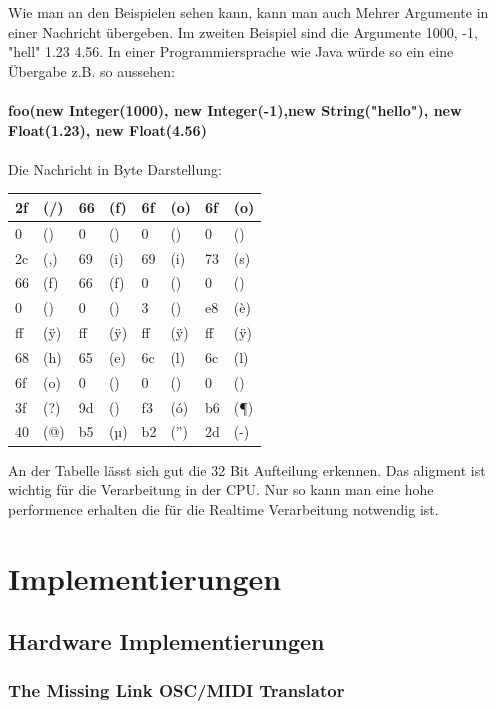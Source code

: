 \documentclass[a4paper, 12pt]{article}
\begin{document}
Wie man an den Beispielen sehen kann, kann man auch Mehrer Argumente in einer Nachricht übergeben. Im zweiten Beispiel sind die Argumente 1000, -1, "hell" 1.23 4.56.
In einer Programmiersprache wie Java würde so ein eine Übergabe z.B. so aussehen: \\
\\
{\bf foo(new Integer(1000), new Integer(-1),new String("hello"), new Float(1.23), new Float(4.56)}\\
\\
Die Nachricht in Byte Darstellung:
\begin{table}[ht]
\centering
\begin{tabular}{|p{0.5cm}|p{1.5cm}|p{0.5cm}|p{1.5cm}|p{0.5cm}|p{1.5cm}|p{0.5cm}|p{1.5cm}|}
\hline
 2f & (/) & 66 & (f) & 6f & (o) & 6f & (o)\\ \hline
 0 & () & 0 & () & 0 & () & 0 & ()\\ \hline
 2c & (,) & 69 & (i) & 69 & (i) & 73 & (s) \\ \hline
 66 & (f) & 66 & (f) & 0 & () & 0 & () \\ \hline
 0 & () & 0 & () & 3 & () & e8 & (è) \\ \hline
 ff & (ÿ) & ff & (ÿ) & ff & (ÿ) & ff & (ÿ) \\
 68 & (h) & 65 & (e) & 6c & (l) & 6c & (l) \\ \hline
 6f & (o) & 0 & () & 0 & () & 0 & () \\ \hline
 3f & (?) & 9d & () & f3 & (ó) & b6 & (¶) \\ \hline
 40 & (@) & b5 & (µ) & b2 & (”) & 2d & (-) \\ \hline
\end{tabular}
\end{table}
\newpage
An der Tabelle lässt sich gut die 32 Bit Aufteilung erkennen.
Das aligment ist wichtig für die Verarbeitung in der CPU. Nur so kann man eine hohe performence erhalten die für die Realtime Verarbeitung notwendig ist. 

\section{Implementierungen}
\subsection{Hardware Implementierungen}
\subsubsection{The Missing Link OSC/MIDI Translator}
\end{document}

